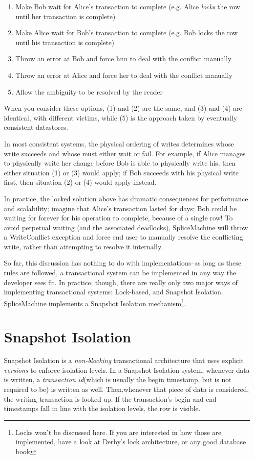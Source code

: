 \begin{enumerate}
				\item Make Bob wait for Alice's transaction to complete (e.g. Alice \emph{locks} the row until her transaction is complete)
				\item Make Alice wait for Bob's transaction to complete (e.g. Bob locks the row until his transaction is complete)
				\item Throw an error at Bob and force him to deal with the conflict manually
				\item Throw an error at Alice and force her to deal with the conflict manually
				\item Allow the ambiguity to be resolved by the reader
\end{enumerate}

When you consider these options, (1) and (2) are the same, and (3) and (4) are identical, with different victims, while (5) is the approach taken by eventually consistent datastores. 

In most consistent systems, the physical ordering of writes determines whose write succeeds and whose must either wait or fail. For example, if Alice manages to physically write her change before Bob is able to physically write his, then either situation (1) or (3) would apply; if Bob succeeds with his physical write first, then situation (2) or (4) would apply instead. 

In practice, the locked solution above has dramatic consequences for performance and scalability; imagine that Alice's transaction lasted for days; Bob could be waiting for forever for his operation to complete, because of a single row! To avoid perpetual waiting (and the associated deadlocks), SpliceMachine will throw a WriteConflict exception and force end user to manually resolve the conflicting write, rather than attempting to resolve it internally.

So far, this discussion has nothing to do with implementations--as long as these rules are followed, a transactional system can be implemented in any way the developer sees fit. In practice, though, there are really only two major ways of implementing transactional systems: Lock-based, and Snapshot Isolation. SpliceMachine implements a Snapshot Isolation mechanism\footnote{Locks won't be discussed here. If you are interested in how those are implemented, have a look at Derby's lock architecture, or any good database book}.

\section{Snapshot Isolation}
Snapshot Isolation is a \emph{non-blocking} transactional architecture that uses explicit \emph{versions} to enforce isolation levels. In a Snapshot Isolation system, whenever data is written, a \emph{transaction id}(which is usually the begin timestamp, but is not required to be) is written as well. Then,whenever that piece of data is considered, the writing transaction is looked up. If the transaction's begin and end timestamps fall in line with the isolation levels, the row is visible.

